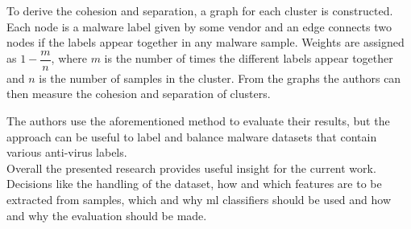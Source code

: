 To derive the cohesion and separation, a graph for each cluster is constructed. Each node is a malware label given by some vendor and an edge connects two nodes if the labels appear together in any malware sample. Weights are assigned as $1 - \dfrac{m}{n}$, where $m$ is the number of times the different labels appear together and $n$ is the number of samples in the cluster. From the graphs the authors can then measure the cohesion and separation of clusters.

The authors use the aforementioned method to evaluate their results, but the approach can be useful to label and balance malware datasets that contain various anti-virus labels.\\

Overall the presented research provides useful insight for the current work. Decisions like the handling of the dataset, how and which features are to be extracted from samples, which and why \gls{ml} classifiers should be used and how and why the evaluation should be made.


